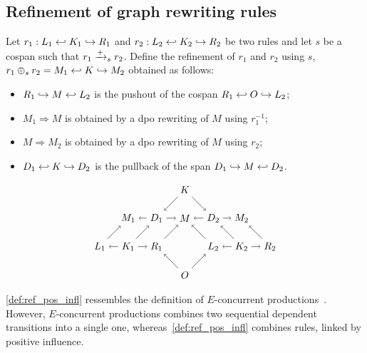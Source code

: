 \subsection{Refinement of graph rewriting rules}

\begin{definition}
  \label{def:ref_pos_infl}
  Let $r_1:L_1\hookleftarrow K_1 \hookrightarrow R_1$ and $r_2:L_2\hookleftarrow K_2 \hookrightarrow R_2$ be two rules and let $s$ be a cospan such that $r_1\mathrel{\xrightarrow{+}}_s r_2$. Define the refinement of $r_1$ and $r_2$ using $s$, $r_1\oplus_s r_2 = M_1\hookleftarrow K\hookrightarrow M_2$ obtained as follows:
  \begin{itemize}
  \item $R_1\hookrightarrow M\hookleftarrow L_2$ is the pushout of the cospan $R_1\hookleftarrow O \hookrightarrow L_2$;
  \item $M_1\Rightarrow M$ is obtained by a dpo rewriting of $M$ using $r_1^{-1}$;
  \item $M\Rightarrow M_2$ is obtained by a dpo rewriting of $M$ using $r_2$;
  \item $D_1\hookleftarrow K\hookrightarrow D_2$ is the pullback of the span $D_1\hookrightarrow M \hookleftarrow D_2$.
  \end{itemize}
  \[
  \begin{tikzpicture} %
  \node (o) at (0,-1) {\(O\)};
  \node (m) at (0,1) {\(M\)};
  \node (d2) at (1,1) {\(D_2\)};
  \node (m2) at (2,1) {\(M_2\)};
  \node (d1) at (-1,1) {\(D_1\)};
  \node (m1) at (-2,1) {\(M_1\)};
  \node (r1) at (-1,0) {\(R_1\)};
  \node (k1) at (-2,0) {\(K_1\)};
  \node (l1) at (-3,0) {\(L_1\)};
  \node (l2) at (1,0) {\(L_2\)};
  \node (k2) at (2,0) {\(K_2\)};
  \node (r2) at (3,0) {\(R_2\)};
  \node (k) at (0,2) {\(K\)};
  \draw [->] (o) -- (r1);
  \draw [->] (o) -- (l2);
  \draw [->] (r1) -- (m);
  \draw [->] (k1) -- (r1);
  \draw [->] (k1) -- (l1);
  \draw [->] (k1) -- (d1);
  \draw [->] (l1) -- (m1);
  \draw [->] (l2) -- (m);
  \draw [->] (k2) -- (r2);
  \draw [->] (k2) -- (l2);
  \draw [->] (k2) -- (d2);
  \draw [->] (r2) -- (m2);
  \draw [->] (d1) -- (m);
  \draw [->] (d1) -- (m1);
  \draw [->] (d2) -- (m);
  \draw [->] (d2) -- (m2);
  \draw [->] (k) -- (d1);
  \draw [->] (k) -- (d2);
\end{tikzpicture}
\]
\end{definition}

\autoref{def:ref_pos_infl} ressembles the definition of $E$-concurrent productions~\cite{AlgebraicGR}. However, $E$-concurrent productions combines two sequential dependent transitions into a single one, whereas~\autoref{def:ref_pos_infl} combines rules, linked by positive influence.

